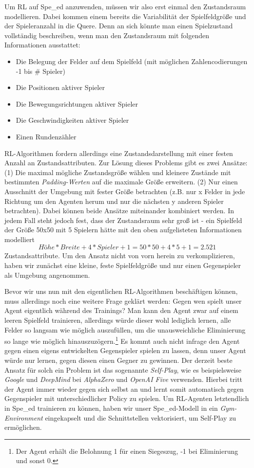 Um \acrshort{RL} auf Spe\_ed anzuwenden, müssen wir also erst einmal den Zustandsraum modellieren. Dabei kommen einem bereits die Variabilität der Spielfeldgröße und der Spieleranzahl in die Quere. Denn an sich könnte man einen Spielzustand vollständig beschreiben, wenn man den Zustandsraum mit folgenden Informationen ausstattet:
\begin{itemize}
	\item Die Belegung der Felder auf dem Spielfeld (mit möglichen Zahlencodierungen -1 bis \# Spieler)
	\item Die Positionen aktiver Spieler
	\item Die Bewegungsrichtungen aktiver Spieler
	\item Die Geschwindigkeiten aktiver Spieler
	\item Einen Rundenzähler
\end{itemize}
\acrshort{RL}-Algorithmen fordern allerdings eine Zustandsdarstellung mit einer festen Anzahl an Zustandsattributen. Zur Lösung dieses Problems gibt es zwei Ansätze: (1) Die maximal mögliche Zustandsgröße wählen und kleinere Zustände mit bestimmten \textit{Padding-Werten} auf die maximale Größe erweitern. (2) Nur einen Ausschnitt der Umgebung mit fester Größe betrachten (z.B. nur x Felder in jede Richtung um den Agenten herum und nur die nächsten y anderen Spieler betrachten). Dabei können beide Ansätze miteinander kombiniert werden. In jedem Fall steht jedoch fest, dass der Zustandsraum sehr groß ist - ein Spielfeld der Größe 50x50 mit 5 Spielern hätte mit den oben aufgelisteten Informationen modelliert \[Höhe*Breite+4*Spieler+1=50*50+4*5+1=2.521\] Zustandsattribute. Um den Ansatz nicht von vorn herein zu verkomplizieren, haben wir zunächst eine kleine, feste Spielfeldgröße und nur einen Gegenspieler als Umgebung angenommen.

Bevor wir uns nun mit den eigentlichen \acrshort{RL}-Algorithmen beschäftigen können, muss allerdings noch eine weitere Frage geklärt werden: Gegen wen spielt unser Agent eigentlich während des Trainings? Man kann den Agent zwar auf einem leeren Spielfeld trainieren, allerdings würde dieser wohl lediglich lernen, alle Felder so langsam wie möglich auszufüllen, um die unausweichliche Eliminierung so lange wie möglich hinauszuzögern.\footnote{Der Agent erhält die Belohnung 1 für einen Siegeszug, -1 bei Eliminierung und sonst 0.} Es kommt auch nicht infrage den Agent gegen einen eigens entwickelten Gegenspieler spielen zu lassen, denn unser Agent würde nur lernen, gegen diesen einen Gegner zu gewinnen. Der derzeit beste Ansatz für solch ein Problem ist das sogenannte \textit{Self-Play}, wie es beispielsweise \textit{Google} und \textit{DeepMind} bei \textit{AlphaZero} \cite{Silver.2018b} und \textit{OpenAI Five} \cite{OpenAI.2019} verwenden. Hierbei tritt der Agent immer wieder gegen sich selbst an und lernt somit automatisch gegen Gegenspieler mit unterschiedlicher Policy zu spielen. Um \acrshort{RL}-Agenten letztendlich in Spe\_ed trainieren zu können, haben wir unser Spe\_ed-Modell in ein \textit{Gym-Environment} \cite{Brockman.2016} eingekapselt und die Schnittstellen vektorisiert, um Self-Play zu ermöglichen.

